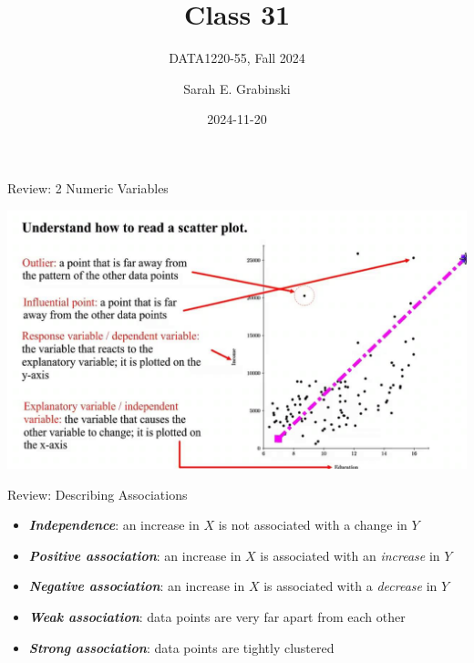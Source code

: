 \documentclass[
  ignorenonframetext,
]{beamer}
\title{Class 31}
\subtitle{DATA1220-55, Fall 2024}
\author{Sarah E. Grabinski}
\date{2024-11-20}
\providecommand{\tightlist}{%
  \setlength{\itemsep}{0pt}\setlength{\parskip}{0pt}}\usepackage{longtable,booktabs,array}
\begin{document}
\frame{\titlepage}


\begin{frame}{Review: 2 Numeric Variables}
\label{review-2-numeric-variables}
\begin{center}
\includegraphics{class31_files/mediabag/scatter-plot-guide.jpg}
\end{center}
\end{frame}

\begin{frame}{Review: Describing Associations}
\label{review-describing-associations}
\begin{itemize}
\tightlist
\item
  \textbf{\emph{Independence}}: an increase in \(X\) is not associated
  with a change in \(Y\)
\end{itemize}

\pause

\begin{itemize}
\tightlist
\item
  \textbf{\emph{Positive association}}: an increase in \(X\) is
  associated with an \emph{increase} in \(Y\)
\end{itemize}

\pause

\begin{itemize}
\tightlist
\item
  \textbf{\emph{Negative association}}: an increase in \(X\) is
  associated with a \emph{decrease} in \(Y\)
\end{itemize}

\pause

\begin{itemize}
\tightlist
\item
  \textbf{\emph{Weak association}}: data points are very far apart from
  each other
\end{itemize}

\pause

\begin{itemize}
\tightlist
\item
  \textbf{\emph{Strong association}}: data points are tightly clustered
\end{itemize}
\end{frame}
\end{document}
